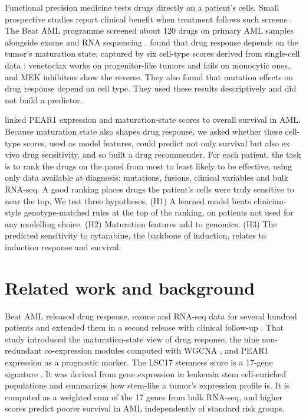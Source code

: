 \documentclass[11pt,logo,nonumbering]{preprint}
\begin{document}
Functional precision medicine tests drugs directly on a patient's cells. Small prospective studies report clinical benefit when treatment follows such screens \citep{kornauth2022,malani2022}. The Beat AML programme screened about 120 drugs on primary AML samples alongside exome and RNA sequencing \citep{tyner2018,bottomly2022}. \citet{bottomly2022} found that drug response depends on the tumor's maturation state, captured by six cell-type scores derived from single-cell data \citep{vangalen2019}: venetoclax works on progenitor-like tumors and fails on monocytic ones, and MEK inhibitors show the reverse. They also found that mutation effects on drug response depend on cell type. They used these results descriptively and did not build a predictor.

\citet{bottomly2022} linked PEAR1 expression and maturation-state scores to overall survival in AML. Because maturation state also shapes drug response, we asked whether these cell-type scores, used as model features, could predict not only survival but also ex vivo drug sensitivity, and so built a drug recommender. For each patient, the task is to rank the drugs on the panel from most to least likely to be effective, using only data available at diagnosis: mutations, fusions, clinical variables and bulk RNA-seq. A good ranking places drugs the patient's cells were truly sensitive to near the top. We test three hypotheses. (H1) A learned model beats clinician-style genotype-matched rules at the top of the ranking, on patients not used for any modelling choice. (H2) Maturation features add to genomics. (H3) The predicted sensitivity to cytarabine, the backbone of induction, relates to induction response and survival.

\section{Related work and background}
Beat AML released drug response, exome and RNA-seq data for several hundred patients \citep{tyner2018} and extended them in a second release with clinical follow-up \citep{bottomly2022}. That study introduced the maturation-state view of drug response, the nine non-redundant co-expression modules computed with WGCNA \citep{langfelder2008wgcna}, and PEAR1 expression as a prognostic marker. The LSC17 stemness score is a 17-gene signature \citep{ng2016lsc17}. It was derived from gene expression in leukemia stem cell-enriched populations and summarizes how stem-like a tumor's expression profile is. It is computed as a weighted sum of the 17 genes from bulk RNA-seq, and higher scores predict poorer survival in AML independently of standard risk groups.
\end{document}
